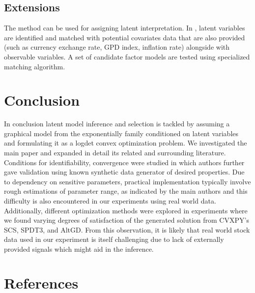 \documentclass[10pt,conference]{IEEEtran}
\begin{document}
\subsection*{Extensions}
The method can be used for assigning latent interpretation. In \cite{Chandra_2}, latent variables are identified and matched with potential covariates data that are also provided (such as currency exchange rate, GPD index, inflation rate) alongside with observable variables. A set of candidate factor models are tested using specialized matching algorithm.

\section{Conclusion} \label{conclusion}
In conclusion latent model inference and selection is tackled by assuming a graphical model from the exponentially family conditioned on latent variables and formulating it as a logdet convex optimization problem. We investigated the main paper \cite{Chandra_1} and expanded in detail its related and surrounding literature. Conditions for identifiability, convergence were studied in which authors further gave validation using known synthetic data generator of desired properties.
Due to dependency on sensitive parameters, practical implementation typically involve rough estimations of parameter range, as indicated by the main authors and this difficulty is also encountered in our experiments using real world data. Additionally, different optimization methods were explored in experiments where we found varying degrees of satisfaction of the generated solution from CVXPY's SCS, SPDT3, and AltGD. From this observation, it is likely that real world stock data used in our experiment is itself challenging due to lack of externally provided signals which might aid in the inference. 

\section*{References}
\printbibliography[heading=none]
\end{document}
